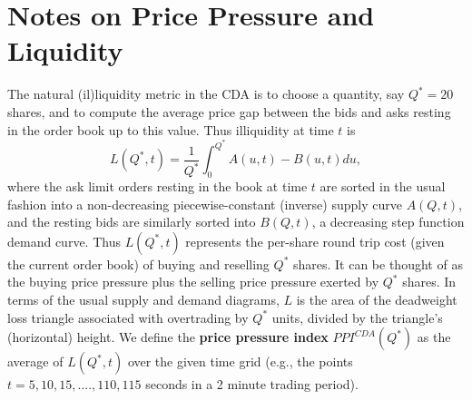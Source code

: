 \section{Notes on Price Pressure and Liquidity}

The natural (il)liquidity metric in the CDA is to choose a quantity, say $Q^*=20$ shares, and to compute the average price gap between the bids and asks resting in the order book up to this value.
Thus illiquidity at time $t$ is
\setcounter{equation}{0}
\begin{equation}\label{eq:Liqcda}
    L(Q^*,t) = \frac{1}{Q^*}\int_0^{Q^*} A(u,t) - B(u,t) du,
\end{equation}
where the ask limit orders resting in the book at time $t$ are sorted in the usual fashion into a non-decreasing piecewise-constant (inverse) supply curve $A(Q,t)$,
and the resting bids are similarly sorted into $B(Q,t)$, a decreasing step function demand curve. 
Thus $L(Q^*,t)$ represents the per-share round trip cost (given the current order book) of buying and reselling $Q^*$ shares. 
It can be thought of as the buying price pressure plus the selling price pressure exerted by $Q^*$ shares.
In terms of the usual supply and demand diagrams, $L$ is the area of the deadweight loss triangle associated with overtrading by $Q^*$ units, divided by the triangle's (horizontal) height. 
We define the \textbf{price pressure index}
$PPI^{CDA}(Q^*)$ as the average of $L(Q^*,t)$ over the given time grid (e.g., the points $t=5, 10, 15, ...., 110, 115$ seconds in a 2 minute trading period).



